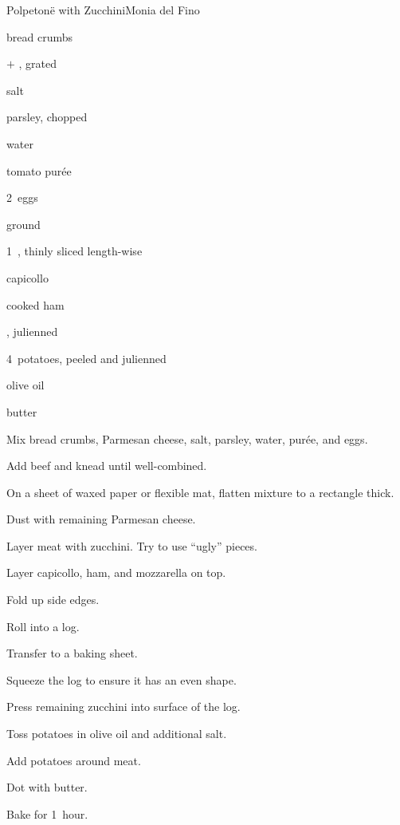 \begin{recipe}{Polpetonë with Zucchini}{Monia del Fino}{}

\begin{ingredients}
\item {} bread crumbs
\item {}$+$ , grated
\item {} salt
\item {} parsley, chopped
\item {} water
\item {} tomato purée
\item 2~eggs
\item {} ground 
\item 1\half{}~, thinly sliced length-wise
\item capicollo
\item cooked ham
\item {}, julienned
\item 4~potatoes, peeled and julienned
\item olive oil
\item butter
\end{ingredients}

\begin{directions}
\item Mix bread crumbs,  Parmesan cheese, salt, parsley, water, purée, and eggs.
\item Add beef and knead until well-combined.
\item On a sheet of waxed paper or flexible mat, flatten mixture to a rectangle \inch{\quarter} thick.
\item Dust with remaining Parmesan cheese.
\item Layer meat with zucchini. Try to use ``ugly'' pieces.
\item Layer capicollo, ham, and mozzarella on top.
\item Fold up side edges.
\item Roll into a log.
\item Transfer to a baking sheet.
\item Squeeze the log to ensure it has an even shape.
\item Press remaining zucchini into surface of the log.
\item Toss potatoes in olive oil and additional salt.
\item Add potatoes around meat.
\item Dot with butter.
\item Bake for 1~hour.
\end{directions}

\end{recipe}
